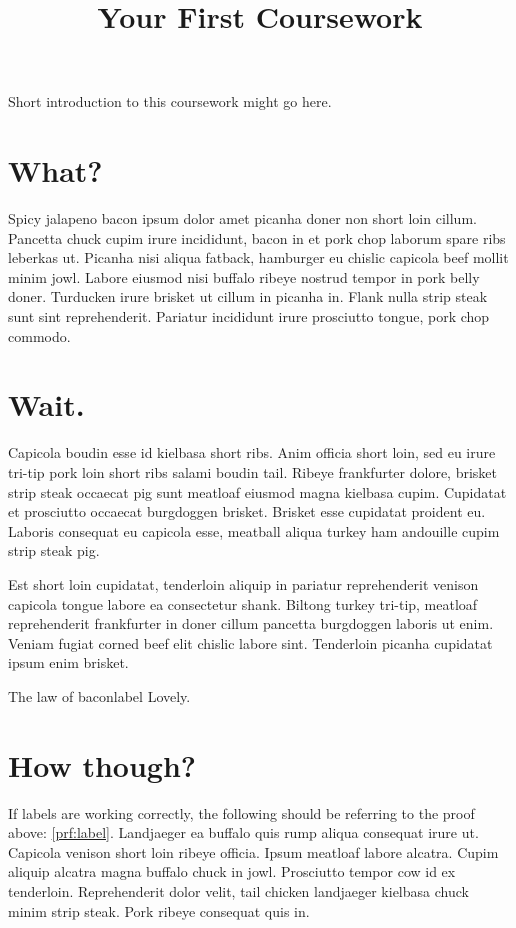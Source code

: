 \documentclass{coursework}
\title{Your First Coursework}
\begin{document}
  Short introduction to this coursework might go here.

  \section{What?}
  Spicy jalapeno bacon ipsum dolor amet picanha doner non short loin cillum. Pancetta chuck cupim irure incididunt, bacon in et pork chop laborum spare ribs leberkas ut. Picanha nisi aliqua fatback, hamburger eu chislic capicola beef mollit minim jowl. Labore eiusmod nisi buffalo ribeye nostrud tempor in pork belly doner. Turducken irure brisket ut cillum in picanha in. Flank nulla strip steak sunt sint reprehenderit. Pariatur incididunt irure prosciutto tongue, pork chop commodo.

  \section{Wait.}
  Capicola boudin esse id kielbasa short ribs. Anim officia short loin, sed eu irure tri-tip pork loin short ribs salami boudin tail. Ribeye frankfurter dolore, brisket strip steak occaecat pig sunt meatloaf eiusmod magna kielbasa cupim. Cupidatat et prosciutto occaecat burgdoggen brisket. Brisket esse cupidatat proident eu. Laboris consequat eu capicola esse, meatball aliqua turkey ham andouille cupim strip steak pig.

  Est short loin cupidatat, tenderloin aliquip in pariatur reprehenderit venison capicola tongue labore ea consectetur shank. Biltong turkey tri-tip, meatloaf reprehenderit frankfurter in doner cillum pancetta burgdoggen laboris ut enim. Veniam fugiat corned beef elit chislic labore sint. Tenderloin picanha cupidatat ipsum enim brisket.

  \begin{Proof}{The law of bacon}{label}
    Lovely. 
  \end{Proof}

  \section{How though?}
  If labels are working correctly, the following should be referring to the proof above: \cref{prf:label}. Landjaeger ea buffalo quis rump aliqua consequat irure ut. Capicola venison short loin ribeye officia. Ipsum meatloaf labore alcatra. Cupim aliquip alcatra magna buffalo chuck in jowl. Prosciutto tempor cow id ex tenderloin. Reprehenderit dolor velit, tail chicken landjaeger kielbasa chuck minim strip steak. Pork ribeye consequat quis in.
\end{document}
